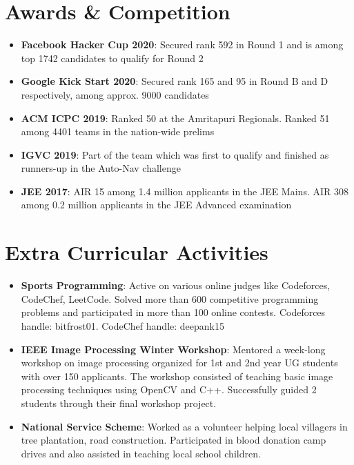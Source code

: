 \documentclass[letterpaper,11pt]{article}
\newcommand{\resumeItem}[2]{
  \item\small{
    \textbf{#1}{: #2 \vspace{-2pt}}
  }
}
\newcommand{\resumeSubItem}[2]{\resumeItem{#1}{#2}\vspace{-4pt}}
\newcommand{\resumeSubHeadingListStart}{\begin{itemize}[leftmargin=*]}
\newcommand{\resumeSubHeadingListEnd}{\end{itemize}}
\begin{document}
\section{Awards \& Competition}
  \resumeSubHeadingListStart
    \resumeSubItem{Facebook Hacker Cup 2020}{Secured rank 592 in Round 1 and is among top 1742 candidates to qualify for Round 2}
    \resumeSubItem{Google Kick Start 2020}{Secured rank 165 and 95 in Round B and D respectively, among approx. 9000 candidates}
    \resumeSubItem{ACM ICPC 2019}{Ranked 50 at the Amritapuri Regionals. Ranked 51 among 4401 teams in the nation-wide prelims}
    \resumeSubItem{IGVC 2019}{Part of the team which was first to qualify and finished as runners-up in the Auto-Nav challenge}
    \resumeSubItem{JEE 2017}{AIR 15 among 1.4 million applicants in the JEE Mains. AIR 308 among 0.2 million applicants in the JEE Advanced examination}
    
  \resumeSubHeadingListEnd
  
 
\section{Extra Curricular Activities}
  \resumeSubHeadingListStart
    \resumeSubItem{Sports Programming}{Active on various online judges like Codeforces, CodeChef, LeetCode. Solved more than 600 competitive programming problems and participated in more than 100 online contests. Codeforces handle: bitfrost01. CodeChef handle: deepank15}
    \resumeSubItem{IEEE Image Processing Winter Workshop}{Mentored a week-long workshop on image processing organized for 1st and 2nd year UG students with over 150 applicants. The workshop consisted of teaching basic image processing techniques using OpenCV and C++. Successfully guided 2 students through their final workshop project.}
    \resumeSubItem{National Service Scheme}{Worked as a volunteer helping local villagers in tree plantation, road construction. Participated in blood donation camp drives and also assisted in teaching local school children.}
  \resumeSubHeadingListEnd
\end{document}
